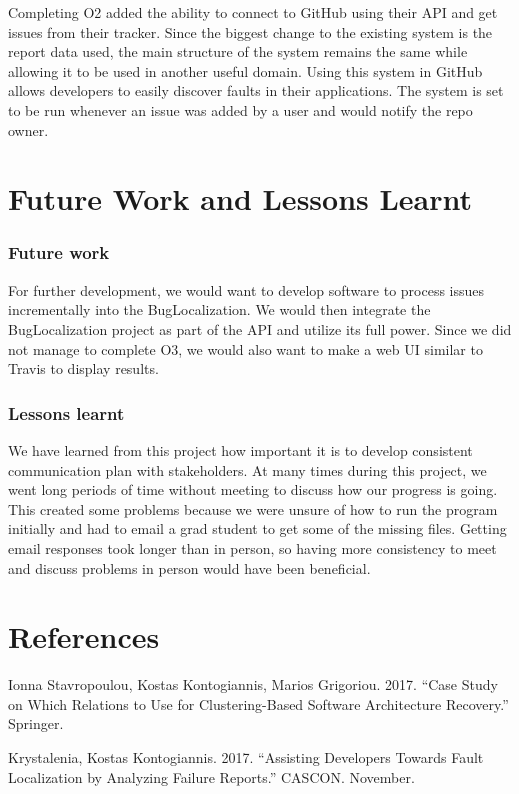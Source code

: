 \documentclass[12pt]{article}
\begin{document}
Completing O2 added the ability to connect to GitHub using their API and
get issues from their tracker. Since the biggest change to the existing
system is the report data used, the main structure of the system remains
the same while allowing it to be used in another useful domain. Using
this system in GitHub allows developers to easily discover faults in
their applications. The system is set to be run whenever an issue was
added by a user and would notify the repo owner.

\section{Future Work and Lessons
Learnt}\label{future-work-and-lessons-learnt}

\subsubsection{Future work}\label{future-work}

For further development, we would want to develop software to process
issues incrementally into the BugLocalization. We would then integrate
the BugLocalization project as part of the API and utilize its full
power. Since we did not manage to complete O3, we would also want to
make a web UI similar to Travis to display results.

\subsubsection{Lessons learnt}\label{lessons-learnt}

We have learned from this project how important it is to develop
consistent communication plan with stakeholders. At many times during
this project, we went long periods of time without meeting to discuss
how our progress is going. This created some problems because we were
unsure of how to run the program initially and had to email a grad
student to get some of the missing files. Getting email responses took
longer than in person, so having more consistency to meet and discuss
problems in person would have been beneficial.

\newpage

\section*{References}\label{references}

\hypertarget{refs}{}
\hypertarget{ref-EMSE}{}
Ionna Stavropoulou, Kostas Kontogiannis, Marios Grigoriou. 2017. ``Case
Study on Which Relations to Use for Clustering-Based Software
Architecture Recovery.'' Springer.

\hypertarget{ref-Fault}{}
Krystalenia, Kostas Kontogiannis. 2017. ``Assisting Developers Towards
Fault Localization by Analyzing Failure Reports.'' CASCON. November.



\end{document}
